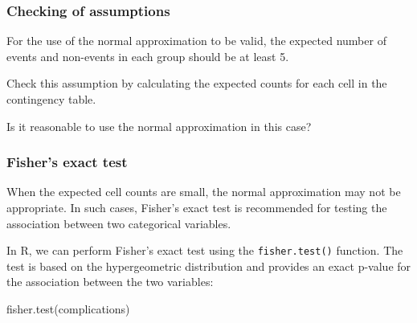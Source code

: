 \documentclass[
  letterpaper,
  DIV=11,
  numbers=noendperiod]{scrartcl}
\newenvironment{Shaded}{\begin{snugshade}}{\end{snugshade}}
\newcommand{\FunctionTok}[1]{\textcolor[rgb]{0.28,0.35,0.67}{#1}}
\newcommand{\NormalTok}[1]{\textcolor[rgb]{0.00,0.23,0.31}{#1}}
\begin{document}
\subsubsection{Checking of assumptions}\label{checking-of-assumptions}

For the use of the normal approximation to be valid, the expected number
of events and non-events in each group should be at least 5.

\begin{tcolorbox}[enhanced jigsaw, bottomrule=.15mm, coltitle=black, colbacktitle=quarto-callout-important-color!10!white, left=2mm, bottomtitle=1mm, breakable, colframe=quarto-callout-important-color-frame, toprule=.15mm, titlerule=0mm, title={Exercise}, opacitybacktitle=0.6, arc=.35mm, rightrule=.15mm, opacityback=0, leftrule=.75mm, toptitle=1mm, colback=white]

Check this assumption by calculating the expected counts for each cell
in the contingency table.

\end{tcolorbox}

\begin{tcolorbox}[enhanced jigsaw, bottomrule=.15mm, coltitle=black, colbacktitle=quarto-callout-important-color!10!white, left=2mm, bottomtitle=1mm, breakable, colframe=quarto-callout-important-color-frame, toprule=.15mm, titlerule=0mm, title={Question 5}, opacitybacktitle=0.6, arc=.35mm, rightrule=.15mm, opacityback=0, leftrule=.75mm, toptitle=1mm, colback=white]

Is it reasonable to use the normal approximation in this case?

\end{tcolorbox}

\subsubsection{Fisher's exact test}\label{fishers-exact-test}

When the expected cell counts are small, the normal approximation may
not be appropriate. In such cases, Fisher's exact test is recommended
for testing the association between two categorical variables.

In R, we can perform Fisher's exact test using the
\texttt{fisher.test()} function. The test is based on the hypergeometric
distribution and provides an exact p-value for the association between
the two variables:

\begin{Shaded}
\begin{Highlighting}[]
\FunctionTok{fisher.test}\NormalTok{(complications)}
\end{Highlighting}
\end{Shaded}
\end{document}
